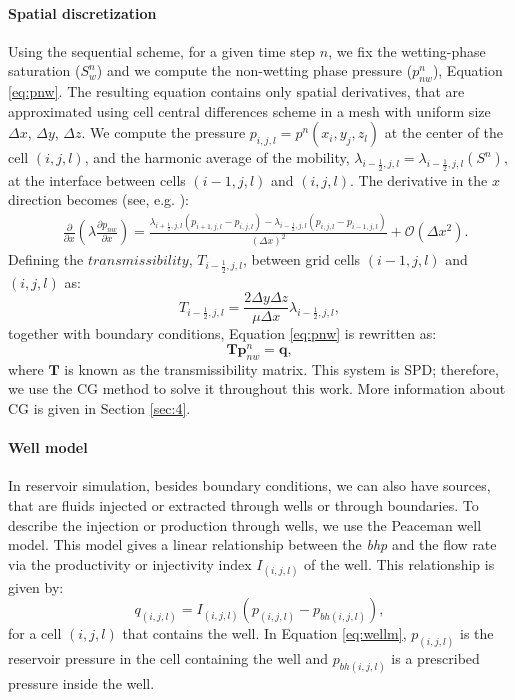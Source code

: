 \documentclass[times,final]{elsarticle}
\begin{document}
 \paragraph{Spatial discretization}
Using the sequential scheme, for a given time step $n$, we fix the wetting-phase saturation ($S_w^n$) and we compute the non-wetting phase pressure ($p_{nw}^n$), Equation \eqref{eq:pnw}. 
The resulting equation contains only spatial derivatives, that are approximated using cell central differences scheme in a mesh with uniform size $\Delta x$, $\Delta y$, $\Delta z$. 
We compute the pressure $p_{i,j,l}=p^n(x_i,y_j,z_l)$ at the center of the cell $(i,j,l)$, and the harmonic average of the mobility, $\lambda _{i-\frac{1}{2},j,l}=\lambda _{i-\frac{1}{2},j,l}(S^n)$, at the interface between cells $(i-1,j,l)$ and $(i,j,l)$. 
The derivative in the $x$ direction becomes (see, e.g. \cite{Aziz79,Chen06,Jansen13,Diaz16}):
\begin{align}\label{eq:diffx}
&\frac{\partial}{\partial x}\left(\lambda \frac{\partial p_{nw}}{\partial x}\right) =\frac{ \lambda _{i+\frac{1}{2},j,l}(p_{i+1,j,l}-p_{i,j,l})-\lambda _{i-\frac{1}{2},j,l}(p_{i,j,l}-p_{i-1,j,l})}{\left( \Delta x\right)^2}+\mathscr{O}(\Delta x^2).
\end{align}
Defining the $transmissibility$, $T_{i-\frac{1}{2},j,l}$, between grid cells $(i-1,j,l)$ and $(i,j,l)$ as:
\begin{equation}\label{eq:htrans}
 T_{i-\frac{1}{2},j,l}=\frac{2\Delta y \Delta z}{\mu\Delta x}
 \lambda_{i-\frac{1}{2},j,l},
\end{equation}  
together with boundary conditions, Equation \eqref{eq:pnw} is rewritten as:
 \begin{equation}\label{eq:cel1}
\mathbf{T}\mathbf{p}^n_{nw} = \mathbf{q},
\end{equation}
where $\mathbf{T}$ is known as the transmissibility matrix. This system is SPD; therefore, we use the CG method to solve it throughout this work. More information about CG is given in Section \ref{sec:4}.\par
\paragraph{Well model} In reservoir simulation, besides boundary conditions, we can also have sources, that are fluids injected or extracted through wells or through boundaries. 
To describe the injection or production through wells, we use the Peaceman well model. This model gives a linear relationship between the \emph{bhp} and the flow rate via the productivity or injectivity index ${I}_{(i,j,l)}$ of the well. This relationship is given by: 
\begin{equation}\label{eq:wellm}
{q}_{(i,j,l)}={I}_{(i,j,l)}({p}_{(i,j,l)}-{p}_{bh(i,j,l)}),
\end{equation}
for a cell $(i,j,l)$ that contains the well. In Equation \eqref{eq:wellm}, ${p}_{(i,j,l)}$ is the reservoir pressure in the cell containing the well
and ${p}_{bh(i,j,l)}$ is a prescribed pressure inside the well.
\end{document}
